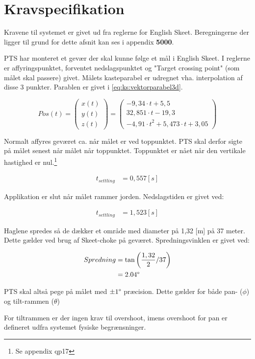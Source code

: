 \section{Kravspecifikation}
\label{sec:kravspecifikation}
Kravene til systemet er givet ud fra reglerne for English Skeet. 
Beregningerne der ligger til grund for dette afsnit kan ses i appendix \textbf{5000}. 

PTS har monteret et gevær der skal kunne følge et mål i English Skeet. I reglerne er affyringspunktet, forventet nedslagspunktet og "Target crossing point" (som målet skal passere) givet. Målets kasteparabel er udregnet vha. interpolation af disse 3 punkter. Parablen er givet i \ref{eq:ks:vektorparabel3d}. 

\begin{equation}
Pos\left( t \right) = 
\left( \begin{matrix} 
	x\left( t \right)  \\ 
	y\left( t \right)  \\ 
	z\left( t \right)  \end{matrix} \right) =
	 \left( \begin{matrix} 
	- 9,34\cdot t+5,5 \\
  32,851\cdot t-19,3 \\ 
 -{ 4,91\cdot t }^{ 2 }+5,473\cdot t+3,05\end{matrix} \right) 
\label{eq:ks:vektorparabel3d}
\end{equation}


Normalt affyres geværet ca. når målet er ved toppunktet. 
PTS skal derfor sigte på målet senest når målet når toppunktet. Toppunktet er nået når den vertikale hastighed er nul.\footnote{Se appendix qp17}

\begin{align}
  t_{settling} &= 0,557 [s]
  \label{eq:ks:settlingtime}
\end{align}

Applikation er slut når målet rammer jorden. Nedslagstiden er givet ved:

\begin{align}
  t_{settling} &= 1,523 [s]
  \label{eq:ks:nedslagstid}
\end{align}

Haglene spredes så de dækker et område med diameter på 1,32 [m] på 37 meter. 
Dette gælder ved brug af Skeet-choke på geværet. Spredningsvinklen er givet ved:

\begin{align}
  Spredning &= \tan \left(\frac{1,32}{2} / 37 \right) \\
  &= 2.04 \degree
  \label{eq:ks:spredning}
\end{align}

PTS skal altså pege på målet med $\pm 1 \degree$ præcision. Dette gælder for både pan- ($\phi$) og tilt-rammen ($\theta$)

For tiltrammen er der ingen krav til overshoot, imens overshoot for pan er defineret udfra systemet fysiske begrænsninger. 




